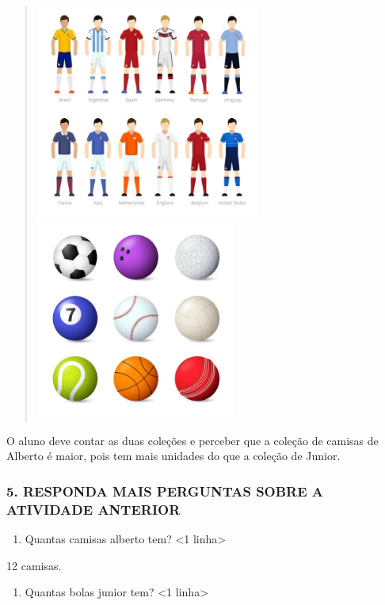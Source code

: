 \begin{quote}
\includegraphics[width=2.90024in,height=2.77508in]{media/image5.jpg}\includegraphics[width=2.59375in,height=2.59375in]{media/image6.jpg}
\end{quote}

O aluno deve contar as duas coleções e perceber que a coleção de camisas
de Alberto é maior, pois tem mais unidades do que a coleção de Junior.

\subsubsection{5. RESPONDA MAIS PERGUNTAS SOBRE A ATIVIDADE
ANTERIOR}\label{responda-mais-perguntas-sobre-a-atividade-anterior}

\begin{enumerate}
\def\labelenumi{\Alph{enumi})}
\item
  Quantas camisas alberto tem? \textless{}1 linha\textgreater{}
\end{enumerate}

12 camisas.

\begin{enumerate}
\def\labelenumi{\Alph{enumi})}
\item
  Quantas bolas junior tem? \textless{}1 linha\textgreater{}
\end{enumerate}


